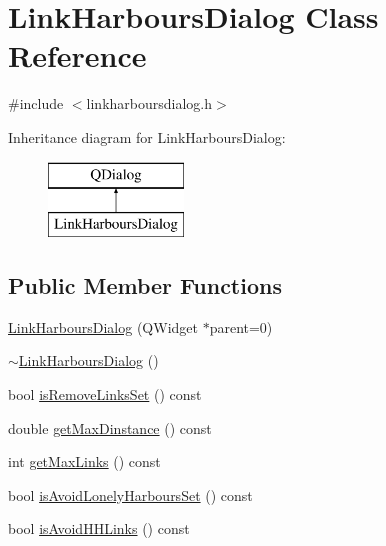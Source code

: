 \hypertarget{class_link_harbours_dialog}{}\section{Link\+Harbours\+Dialog Class Reference}
\label{class_link_harbours_dialog}


{\ttfamily \#include $<$linkharboursdialog.\+h$>$}

Inheritance diagram for Link\+Harbours\+Dialog\+:\begin{figure}[H]
\begin{center}
\leavevmode
\includegraphics[height=2.000000cm]{dd/dec/class_link_harbours_dialog}
\end{center}
\end{figure}
\subsection*{Public Member Functions}
\begin{DoxyCompactItemize}
\item 
\mbox{\hyperlink{class_link_harbours_dialog_a5f4f4a3b3a0c4e9c1d36aba4392fa567}{Link\+Harbours\+Dialog}} (Q\+Widget $\ast$parent=0)
\item 
\mbox{\hyperlink{class_link_harbours_dialog_ad4b4b5c2ff0be2de7dc41101091c47bb}{$\sim$\+Link\+Harbours\+Dialog}} ()
\item 
bool \mbox{\hyperlink{class_link_harbours_dialog_ad1f55ba3288b9827ec9728615d29ef5a}{is\+Remove\+Links\+Set}} () const
\item 
double \mbox{\hyperlink{class_link_harbours_dialog_af7f5dc1a6d2e27f6a3fce4103a3e94d8}{get\+Max\+Dinstance}} () const
\item 
int \mbox{\hyperlink{class_link_harbours_dialog_a4b81c66ee15846e1448296c14e5e6728}{get\+Max\+Links}} () const
\item 
bool \mbox{\hyperlink{class_link_harbours_dialog_a73d91f306732a1ac9dac5eab355223c7}{is\+Avoid\+Lonely\+Harbours\+Set}} () const
\item 
bool \mbox{\hyperlink{class_link_harbours_dialog_a1028da24bc759c8c48d4ab54f5dc218f}{is\+Avoid\+H\+H\+Links}} () const
\end{DoxyCompactItemize}


